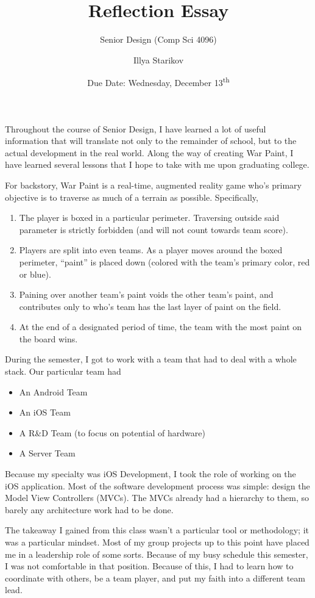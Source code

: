 \documentclass[12pt]{scrartcl}
\title{Reflection Essay}
\subtitle{Senior Design (Comp Sci 4096)}
\date{Due Date: Wednesday, December 13\textsuperscript{th}}
\author{Illya Starikov}
\begin{document}
\maketitle

Throughout the course of Senior Design, I have learned a lot of useful information that will translate not only to the remainder of school, but to the actual development in the real world. Along the way of creating War Paint, I have learned several lessons that I hope to take with me upon graduating college.

For backstory, War Paint is a real-time, augmented reality game who's primary objective is to traverse as much of a terrain as possible. Specifically,

\begin{enumerate}
    \item The player is boxed in a particular perimeter. Traversing outside said parameter is strictly forbidden (and will not count towards team score).
    \item Players are split into even teams. As a player moves around the boxed perimeter, ``paint'' is placed down (colored with the team's primary color, red or blue).
    \item Paining over another team's paint voids the other team's paint, and contributes only to who's team has the last layer of paint on the field.
    \item At the end of a designated period of time, the team with the most paint on the board wins.
\end{enumerate}

During the semester, I got to work with a team that had to deal with a whole stack. Our particular team had

\begin{itemize}
    \item An Android Team
    \item An iOS Team
    \item A R\&D Team (to focus on potential of hardware)
    \item A Server Team
\end{itemize}

Because my specialty was iOS Development, I took the role of working on the iOS application. Most of the software development process was simple: design the Model View Controllers (MVCs). The MVCs already had a hierarchy to them, so barely any architecture work had to be done.

The takeaway I gained from this class wasn't a particular tool or methodology; it was a particular mindset. Most of my group projects up to this point have placed me in a leadership role of some sorts. Because of my busy schedule this semester, I was not comfortable in that position. Because of this, I had to learn how to coordinate with others, be a team player, and put my faith into a different team lead.
\end{document}
